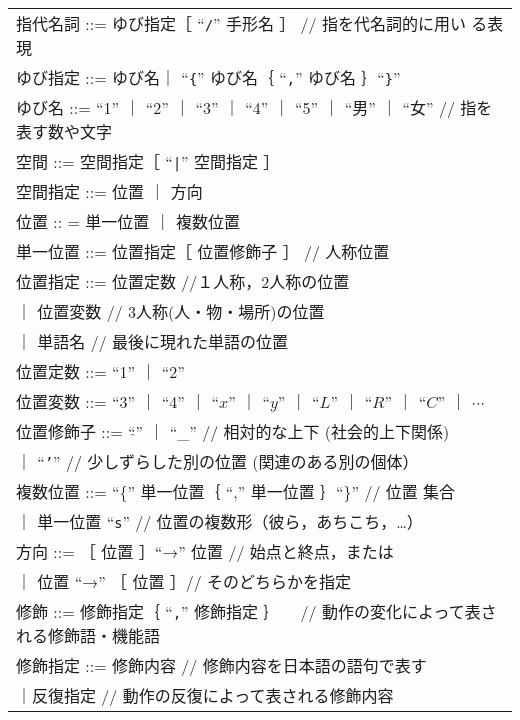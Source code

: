 \begin{center}
\begin{supertabular}{|p{13.6cm}|}
    指代名詞 ::= ゆび指定［ ``{\tt /}'' 手形名 ］ \hfill // 指を代名詞的に用い
    る表現 \\
    ゆび指定 ::= ゆび名｜ ``{\tt\{}'' ゆび名｛ ``{\tt ,}''
    ゆび名 ｝``{\tt\}}''\\
    ゆび名 ::= ``1'' ｜ ``2'' ｜ ``3'' ｜ ``4'' ｜ ``5'' ｜ ``男'' ｜ ``女''
    \hfill // 指を表す数や文字 \\
    空間 ::= 空間指定［ ``\verb+|+'' 空間指定 ］\\
    空間指定 ::= 位置 ｜ 方向 \\ 
    位置 :: = 単一位置 ｜ 複数位置 \\
    単一位置 ::= 位置指定［ 位置修飾子 ］ \hfill // 人称位置 \\
    位置指定 ::= 位置定数	\hfill //１人称，2人称の位置 \\
    \hspace{5zw}｜ 位置変数	\hfill // 3人称(人・物・場所)の位置 \\
    \hspace{5zw}｜ 単語名	\hfill // 最後に現れた単語の位置 \\
    位置定数 ::= ``1'' ｜ ``2'' \\
    位置変数 ::= ``3'' ｜ ``4'' ｜ ``$x$'' ｜ ``$y$'' ｜ ``$L$'' ｜ ``$R$'' ｜
    ``$C$'' ｜ $\cdots$ \\
    位置修飾子 ::= ``$\hat{　}$'' ｜ ``\_''
    \hfill // 相対的な上下 (社会的上下関係)\\
    \hspace{6zw}｜ ``{\tt '}''
    \hfill // 少しずらした別の位置 (関連のある別の個体） \\
    複数位置 ::= ``\{''  単一位置｛ ``,'' 単一位置 ｝``\}'' \hfill // 位置
    集合 \\
    \hspace{5zw}｜ 単一位置 ``{\tt s}''
    \hfill // 位置の複数形（彼ら，あちこち，…） \\
    方向 ::= ［ 位置 ］``→'' 位置 \hfill // 始点と終点，または \\
    \hspace{5zw}｜ 位置 ``→'' ［ 位置 ］\hfill // そのどちらかを指定 \\
    修飾 ::= 修飾指定｛ ``{\tt ,}''  修飾指定 ｝
    　\hfill // 動作の変化によって表される修飾語・機能語 \\
    修飾指定 ::= 修飾内容   \hfill // 修飾内容を日本語の語句で表す \\
    \hspace{5zw}｜反復指定 \hfill // 動作の反復によって表される修飾内容 \\

\end{supertabular}
\end{center}
